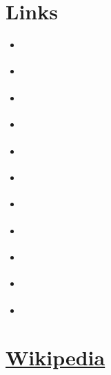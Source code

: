 \section{Links}

\begin{itemize}

 \item \parencite{web:chars-74k}
 \item \parencite{web:chars-74k-hand-drawn}
 \item \parencite{web:equation-editor}
 \item \parencite{web:history-binomial}
 \item \parencite{web:license-maker}
 \item \parencite{web:ecs}
 \item \parencite{web:pact-adp}
 \item \parencite{web:pact-ce21-2013}
 \item \parencite{web:7-big-ideas}
 \item \parencite{web:5-cs}
 \item \parencite{web:national-imperative-k12-csed}

\end{itemize}

\section{\href{https://wikipedia.com/}{Wikipedia}}

